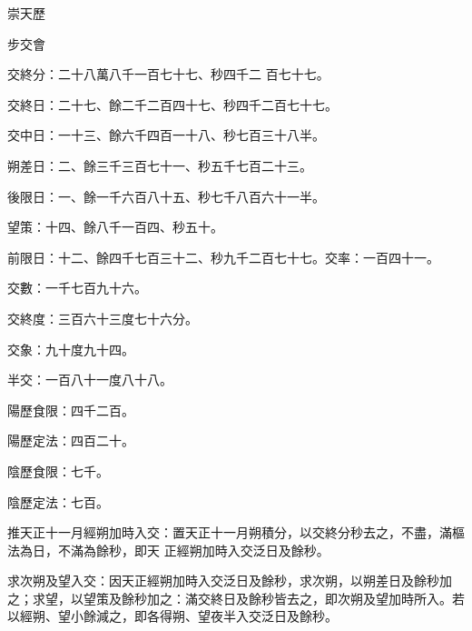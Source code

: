 
\begin{pinyinscope}

 崇天歷



 步交會



 交終分：二十八萬八千一百七十七、秒四千二
 百七十七。



 交終日：二十七、餘二千二百四十七、秒四千二百七十七。



 交中日：一十三、餘六千四百一十八、秒七百三十八半。



 朔差日：二、餘三千三百七十一、秒五千七百二十三。



 後限日：一、餘一千六百八十五、秒七千八百六十一半。



 望策：十四、餘八千一百四、秒五十。



 前限日：十二、餘四千七百三十二、秒九千二百七十七。交率：一百四十一。



 交數：一千七百九十六。



 交終度：三百六十三度七十六分。



 交象：九十度九十四。



 半交：一百八十一度八十八。



 陽歷食限：四千二百。



 陽歷定法：四百二十。



 陰歷食限：七千。



 陰歷定法：七百。



 推天正十一月經朔加時入交：置天正十一月朔積分，以交終分秒去之，不盡，滿樞法為日，不滿為餘秒，即天
 正經朔加時入交泛日及餘秒。



 求次朔及望入交：因天正經朔加時入交泛日及餘秒，求次朔，以朔差日及餘秒加之；求望，以望策及餘秒加之：滿交終日及餘秒皆去之，即次朔及望加時所入。若以經朔、望小餘減之，即各得朔、望夜半入交泛日及餘秒。




\end{pinyinscope}

